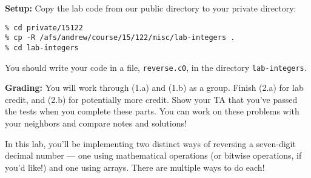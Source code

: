 \textbf{Setup:} Copy the lab code from our
public directory to your private directory:

\lstinline[language={[coin]C}]'%
\lstinline[language={[coin]C}]'%
\lstinline[language={[coin]C}]'%

You should write your code in a file, \lstinline'reverse.c0', in
the directory \lstinline'lab-integers'.

\textbf{Grading:} You will work through (1.a) and (1.b) as a group.
Finish (2.a) for lab credit, and (2.b) for potentially more
credit. Show your TA that you've passed the tests when you complete
these parts. You can work on these problems with your neighbors and
compare notes and solutions!

\medskip
In this lab, you'll be implementing two distinct ways of
reversing a seven-digit decimal number --- one using mathematical
operations (or bitwise operations, if you'd like!) and one using
arrays. There are multiple ways to do each!
